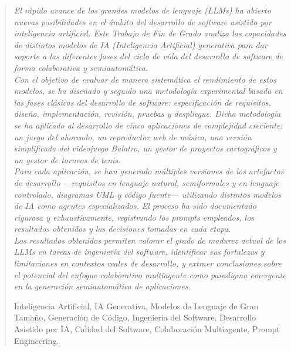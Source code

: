 \documentclass[english,a4paper,12pt,oneside]{extreport}
\newenvironment{palabrasClave}
{\begin{list}{}{\setlength{\leftmargin}{1em}}\item[\hskip\labelsep \bfseries Palabras clave:]}
{\end{list}}
\begin{document}
\begin{abstract}
{\em
El rápido avance de los grandes modelos de lenguaje (LLMs) ha abierto nuevas posibilidades en el ámbito del desarrollo de software asistido por inteligencia artificial. Este Trabajo de Fin de Grado analiza las capacidades de distintos modelos de IA (Inteligencia Artificial) generativa para dar soporte a las diferentes fases del ciclo de vida del desarrollo de software de forma colaborativa y semiautomática.\\

Con el objetivo de evaluar de manera sistemática el rendimiento de estos modelos, se ha diseñado y seguido una metodología experimental basada en las fases clásicas del desarrollo de software: especificación de requisitos, diseño, implementación, revisión, pruebas y despliegue. Dicha metodología se ha aplicado al desarrollo de cinco aplicaciones de complejidad creciente: un juego del ahorcado, un reproductor web de música, una versión simplificada del videojuego Balatro, un gestor de proyectos cartográficos y un gestor de torneos de tenis.\\

Para cada aplicación, se han generado múltiples versiones de los artefactos de desarrollo ---requisitos en lenguaje natural, semiformales y en lenguaje controlado, diagramas UML y código fuente--- utilizando distintos modelos de IA como agentes especializados. El proceso ha sido documentado rigurosa y exhaustivamente, registrando los prompts empleados, los resultados obtenidos y las decisiones tomadas en cada etapa.\\

Los resultados obtenidos permiten valorar el grado de madurez actual de los LLMs en tareas de ingeniería del software, identificar sus fortalezas y limitaciones en contextos reales de desarrollo, y extraer conclusiones sobre el potencial del enfoque colaborativo multiagente como paradigma emergente en la generación semiautomática de aplicaciones.
}

\begin{palabrasClave}
Inteligencia Artificial, IA Generativa, Modelos de Lenguaje de Gran Tamaño, Generación de Código, Ingeniería del Software, Desarrollo Asistido por IA, Calidad del Software, Colaboración Multiagente, Prompt Engineering.
\end{palabrasClave}
\end{abstract}
\end{document}
